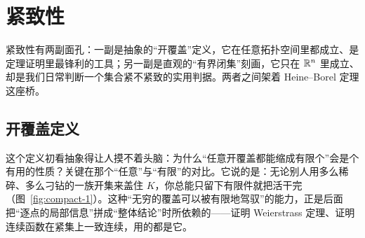 \section{紧致性}
\label{sec:compact-compactness}

紧致性有两副面孔：一副是抽象的``开覆盖''定义，它在任意拓扑空间里都成立、是定理证明里最锋利的工具；另一副是直观的``有界闭集''刻画，它只在 $\mathbb{R}^n$ 里成立、却是我们日常判断一个集合紧不紧致的实用判据。两者之间架着 Heine--Borel 定理这座桥。

\subsection{开覆盖定义}


这个定义初看抽象得让人摸不着头脑：为什么``任意开覆盖都能缩成有限个''会是个有用的性质？关键在那个``任意''与``有限''的对比。它说的是：无论别人用多么稀碎、多么刁钻的一族开集来盖住 $K$，你总能只留下有限件就把活干完（图~\ref{fig:compact-1}）。这种``无穷的覆盖可以被有限地驾驭''的能力，正是后面把``逐点的局部信息''拼成``整体结论''时所依赖的——证明 Weierstrass 定理、证明连续函数在紧集上一致连续，用的都是它。

